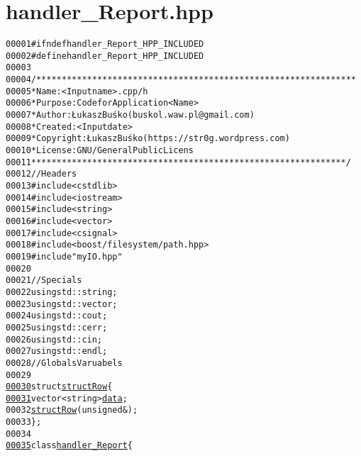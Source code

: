 \hypertarget{handler__Report_8hpp_source}{
\section{handler\_\-Report.hpp}
}


\begin{footnotesize}\begin{alltt}
00001 \textcolor{preprocessor}{#ifndef handler\_Report\_HPP\_INCLUDED}
00002 \textcolor{preprocessor}{}\textcolor{preprocessor}{#define handler\_Report\_HPP\_INCLUDED}
00003 \textcolor{preprocessor}{}
00004 \textcolor{comment}{/***************************************************************}
00005 \textcolor{comment}{ * Name:      <Input name>.cpp/h}
00006 \textcolor{comment}{ * Purpose:   Code for Application <Name>}
00007 \textcolor{comment}{ * Author:    Łukasz Buśko (buskol.waw.pl@gmail.com)}
00008 \textcolor{comment}{ * Created:   <Input date>}
00009 \textcolor{comment}{ * Copyright: Łukasz Buśko (https://str0g.wordpress.com)}
00010 \textcolor{comment}{ * License:   GNU / General Public Licens}
00011 \textcolor{comment}{ **************************************************************/}
00012 \textcolor{comment}{//Headers}
00013 \textcolor{preprocessor}{#include <cstdlib>}
00014 \textcolor{preprocessor}{#include <iostream>}
00015 \textcolor{preprocessor}{#include <string>}
00016 \textcolor{preprocessor}{#include <vector>}
00017 \textcolor{preprocessor}{#include <csignal>}
00018 \textcolor{preprocessor}{#include <boost/filesystem/path.hpp>}
00019 \textcolor{preprocessor}{#include "myIO.hpp"}
00020 
00021 \textcolor{comment}{//Specials}
00022 \textcolor{keyword}{using} std::string;
00023 \textcolor{keyword}{using} std::vector;
00024 \textcolor{keyword}{using} std::cout;
00025 \textcolor{keyword}{using} std::cerr;
00026 \textcolor{keyword}{using} std::cin;
00027 \textcolor{keyword}{using} std::endl;
00028 \textcolor{comment}{//Globals Varuabels}
00029 
\hypertarget{handler__Report_8hpp_source_l00030}{}\hyperlink{structstructRow}{00030} \textcolor{keyword}{struct }\hyperlink{structstructRow}{structRow}\{
\hypertarget{handler__Report_8hpp_source_l00031}{}\hyperlink{structstructRow_a627f7dc245b2dd29b2c94e02f5347573}{00031}     vector<string> \hyperlink{structstructRow_a627f7dc245b2dd29b2c94e02f5347573}{data}; 
00032     \hyperlink{structstructRow_a09213fb7bb170a682869db469718761e}{structRow}(\textcolor{keywordtype}{unsigned} &);
00033 \};
00034 
\hypertarget{handler__Report_8hpp_source_l00035}{}\hyperlink{classhandler__Report}{00035} \textcolor{keyword}{class }\hyperlink{classhandler__Report}{handler_Report}\{

\end{alltt}
\end{footnotesize}
